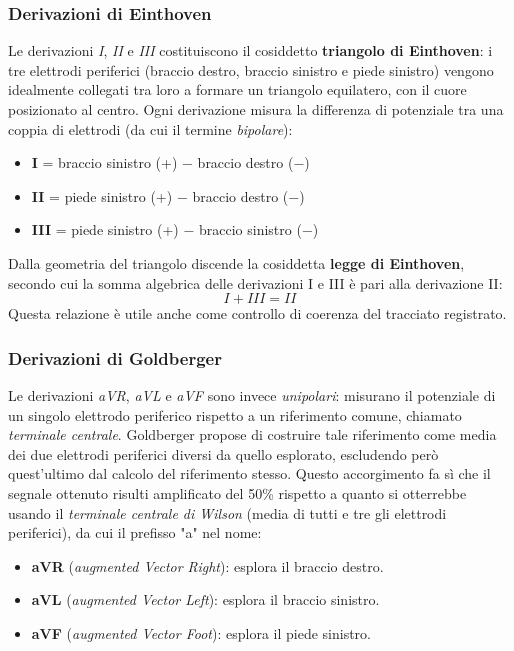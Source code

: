 \subsubsection{Derivazioni di Einthoven}
Le derivazioni \textit{I}, \textit{II} e \textit{III} costituiscono il cosiddetto \textbf{triangolo di Einthoven}: i tre elettrodi periferici (braccio destro, braccio sinistro e piede sinistro) vengono idealmente collegati tra loro a formare un triangolo equilatero, con il cuore posizionato al centro. Ogni derivazione misura la differenza di potenziale tra una coppia di elettrodi (da cui il termine \textit{bipolare}):
\begin{itemize}
    \item \textbf{I} = braccio sinistro (+) $-$ braccio destro ($-$)
    \item \textbf{II} = piede sinistro (+) $-$ braccio destro ($-$)
    \item \textbf{III} = piede sinistro (+) $-$ braccio sinistro ($-$)
\end{itemize}
Dalla geometria del triangolo discende la cosiddetta \textbf{legge di Einthoven}, secondo cui la somma algebrica delle derivazioni I e III è pari alla derivazione II:
\[
I + III = II
\]
Questa relazione è utile anche come controllo di coerenza del tracciato registrato.

\subsubsection{Derivazioni di Goldberger}
Le derivazioni \textit{aVR}, \textit{aVL} e \textit{aVF} sono invece \textit{unipolari}: misurano il potenziale di un singolo elettrodo periferico rispetto a un riferimento comune, chiamato \textit{terminale centrale}. Goldberger propose di costruire tale riferimento come media dei due elettrodi periferici diversi da quello esplorato, escludendo però quest'ultimo dal calcolo del riferimento stesso. Questo accorgimento fa sì che il segnale ottenuto risulti amplificato del 50\% rispetto a quanto si otterrebbe usando il \textit{terminale centrale di Wilson} (media di tutti e tre gli elettrodi periferici), da cui il prefisso "a" nel nome:
\begin{itemize}
    \item \textbf{aVR} (\textit{augmented Vector Right}): esplora il braccio destro.
    \item \textbf{aVL} (\textit{augmented Vector Left}): esplora il braccio sinistro.
    \item \textbf{aVF} (\textit{augmented Vector Foot}): esplora il piede sinistro.
\end{itemize}

